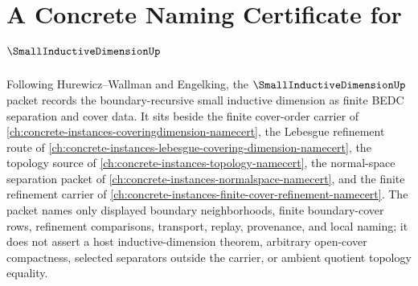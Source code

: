 \chapter{A Concrete Naming Certificate for $\SmallInductiveDimensionUp$}
\label{ch:concrete-instances-small-inductive-dimension-namecert}

Following Hurewicz--Wallman and Engelking, the $\SmallInductiveDimensionUp$ packet records the boundary-recursive small inductive dimension as finite BEDC separation and cover data. It sits beside the finite cover-order carrier of \autoref{ch:concrete-instances-coveringdimension-namecert}, the Lebesgue refinement route of \autoref{ch:concrete-instances-lebesgue-covering-dimension-namecert}, the topology source of \autoref{ch:concrete-instances-topology-namecert}, the normal-space separation packet of \autoref{ch:concrete-instances-normalspace-namecert}, and the finite refinement carrier of \autoref{ch:concrete-instances-finite-cover-refinement-namecert}. The packet names only displayed boundary neighborhoods, finite boundary-cover rows, refinement comparisons, transport, replay, provenance, and local naming; it does not assert a host inductive-dimension theorem, arbitrary open-cover compactness, selected separators outside the carrier, or ambient quotient topology equality.

